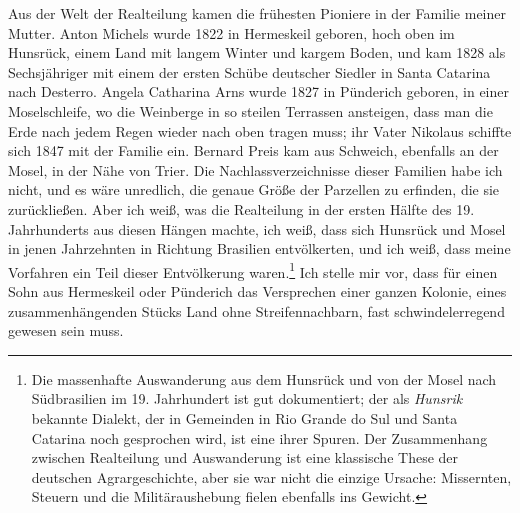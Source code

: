 \documentclass[
  ngerman,
  11pt,
  openany]{book}
\begin{document}
Aus der Welt der Realteilung kamen die frühesten Pioniere in der Familie
meiner Mutter. Anton Michels wurde 1822 in Hermeskeil geboren, hoch oben
im Hunsrück, einem Land mit langem Winter und kargem Boden, und kam 1828
als Sechsjähriger mit einem der ersten Schübe deutscher Siedler in Santa
Catarina nach Desterro. Angela Catharina Arns wurde 1827 in Pünderich
geboren, in einer Moselschleife, wo die Weinberge in so steilen
Terrassen ansteigen, dass man die Erde nach jedem Regen wieder nach oben
tragen muss; ihr Vater Nikolaus schiffte sich 1847 mit der Familie ein.
Bernard Preis kam aus Schweich, ebenfalls an der Mosel, in der Nähe von
Trier. Die Nachlassverzeichnisse dieser Familien habe ich nicht, und es
wäre unredlich, die genaue Größe der Parzellen zu erfinden, die sie
zurückließen. Aber ich weiß, was die Realteilung in der ersten Hälfte
des 19. Jahrhunderts aus diesen Hängen machte, ich weiß, dass sich
Hunsrück und Mosel in jenen Jahrzehnten in Richtung Brasilien
entvölkerten, und ich weiß, dass meine Vorfahren ein Teil dieser
Entvölkerung waren.\footnote{Die massenhafte Auswanderung aus dem
  Hunsrück und von der Mosel nach Südbrasilien im 19. Jahrhundert ist
  gut dokumentiert; der als \emph{Hunsrik} bekannte Dialekt, der in
  Gemeinden in Rio Grande do Sul und Santa Catarina noch gesprochen
  wird, ist eine ihrer Spuren. Der Zusammenhang zwischen Realteilung und
  Auswanderung ist eine klassische These der deutschen Agrargeschichte,
  aber sie war nicht die einzige Ursache: Missernten, Steuern und die
  Militäraushebung fielen ebenfalls ins Gewicht.} Ich stelle mir vor,
dass für einen Sohn aus Hermeskeil oder Pünderich das Versprechen einer
ganzen Kolonie, eines zusammenhängenden Stücks Land ohne
Streifennachbarn, fast schwindelerregend gewesen sein muss.
\end{document}
